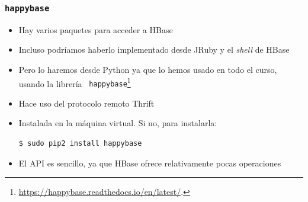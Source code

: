\documentclass[14pt]{beamer}
\begin{document}
\begin{frame}[fragile]
  \frametitle{{\tt happybase}}
  \begin{itemize}
\item Hay varios paquetes para acceder a HBase
\item Incluso podríamos haberlo implementado desde JRuby y el {\em shell\/}
  de HBase
\item Pero lo haremos desde Python ya que lo hemos usado en todo el curso,
  usando la librería {\tt
    happybase}\footnote{\url{https://happybase.readthedocs.io/en/latest/}.}
\item Hace uso del protocolo remoto Thrift
\item Instalada en la máquina virtual. Si no, para instalarla:
\begin{lstlisting}[language=bash]
$ sudo pip2 install happybase
\end{lstlisting}
\item El API es sencillo, ya que HBase ofrece relativamente pocas
  operaciones
\end{itemize}
\end{frame}
\end{document}
